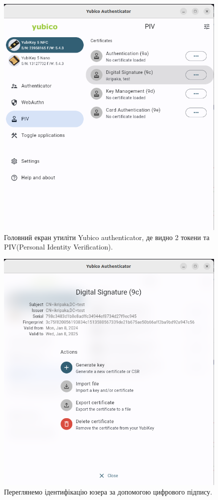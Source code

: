 \begin{figure}[!h]
    		\centering
    		\includegraphics[scale = 0.3]{IMAGES/app_view_main_screen.png}
    		\caption{Головний екран утиліти Yubico authenticator, де видно 2 токени та PIV(Personal Identity Verification).}
    		\label{fig:app_view_main_screen}
	\end{figure}

\begin{figure}[!h]
    		\centering
    		\includegraphics[scale = 0.3]{IMAGES/app_view_token.png}
    		\caption{Переглянемо ідентифікацію юзера за допомогою цифрового підпису.}
    		\label{fig:app_view_token}
	\end{figure}

